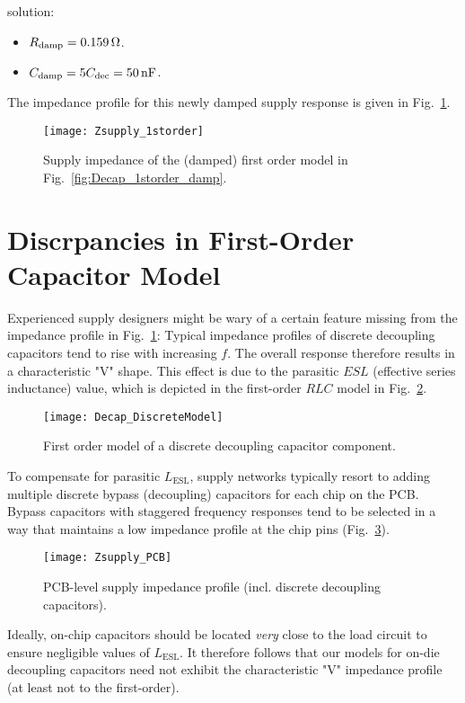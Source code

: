 solution:
\begin{itemize}[noitemsep]
\item $R_\mathrm{damp}=0.159\mathrm{\,\Omega}$.
\item $C_\mathrm{damp}=5 C_\mathrm{dec}=50\mathrm{\,nF}$.
\end{itemize}
%
\par\noindent The impedance profile for this newly damped supply response is
given in Fig.~\ref{fig:Zsupply_1storder}.
\begin{figure}[!ht]
	\centering
	\texttt{[image: Zsupply\_1storder]}
	\caption{Supply impedance of the (damped) first order model in Fig.~\ref{fig:Decap_1storder_damp}.}
\label{fig:Zsupply_1storder}%
\end{figure}
%
\section{Discrpancies in First-Order Capacitor Model}
\par Experienced supply designers might be wary of a certain feature missing from the
impedance profile in Fig.~\ref{fig:Zsupply_1storder}: Typical impedance
profiles of discrete decoupling capacitors tend to rise with increasing $f$.
The overall response therefore results in a characteristic "V" shape. This
effect is due to the parasitic $ESL$ (effective series inductance) value,
which is depicted in the first-order $RLC$ model in Fig.~\ref{fig:Decap_DiscreteModel}.
%
\begin{figure}[!ht]
	\centering
	\texttt{[image: Decap\_DiscreteModel]}
	\caption{First order model of a discrete decoupling capacitor component.}
\label{fig:Decap_DiscreteModel}%
\end{figure}
%
\par To compensate for parasitic $L_\mathrm{ESL}$, supply networks typically
resort to adding multiple discrete bypass (decoupling) capacitors for each chip
on the PCB. Bypass capacitors with staggered frequency responses tend to be
selected in a way that maintains a low impedance profile at the chip pins
(Fig.~\ref{fig:Zsupply_PCB}).
%
\begin{figure}[!ht]
	\centering
	\texttt{[image: Zsupply\_PCB]}
	\caption{PCB-level supply impedance profile (incl. discrete decoupling capacitors).}
\label{fig:Zsupply_PCB}%
\end{figure}
%
\par Ideally, on-chip capacitors should be located \emph{very} close to the
load circuit to ensure negligible values of $L_\mathrm{ESL}$. It
therefore follows that our models for on-die decoupling capacitors need not
exhibit the characteristic "V" impedance profile (at least not to the
first-order).
%
